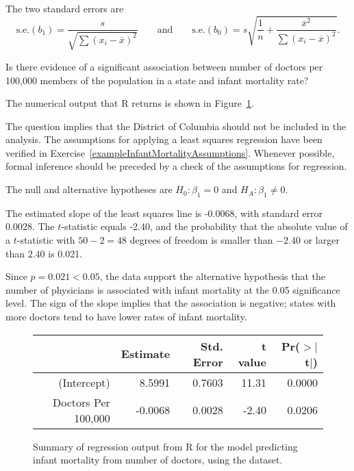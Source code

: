 The two standard errors are
\[\text{s.e.}(b_1) = \frac{s}{\sqrt{\sum(x_i -\overline{x})^2}}  \qquad \text{and} \qquad \text{s.e.}(b_0) = s \sqrt{\frac{1}{n} + \frac{\overline{x}^2}
	{\sum(x_i - \overline{x})^2}}. \]

\textD{\newpage}

\begin{examplewrap}
\begin{nexample}{Is there evidence of a significant association between number of doctors per 100,000 members of the population in a state and infant mortality rate? 
		
The numerical output that \textsf{R} returns is shown in Figure~\ref{infantMortalityInferenceOutput}.\footnotemark{}}\label{exampleInfantMortalityInference}%
The question implies that the District of Columbia should not be included in the analysis. The assumptions for applying a least squares regression have been verified in Exercise~\ref{exampleInfantMortalityAssumptions}. Whenever possible, formal inference should be preceded by a check of the assumptions for regression.

The null and alternative hypotheses are $H_0:\beta_1 = 0$ and $H_A:\beta_1 \neq 0.$	

The estimated slope of the least squares line is -0.0068, with standard error 0.0028. The $t$-statistic equals -2.40, and the probability that the absolute value of a $t$-statistic with $50-2=48$ degrees of freedom is smaller than $-2.40$ or larger than $2.40$ is 0.021. 

Since $p = 0.021 < 0.05$, the data support the alternative hypothesis that the number of physicians is associated with infant mortality at the 0.05 significance level. The sign of the slope implies that the association is negative; states with more doctors tend to have lower rates of infant mortality.
\end{nexample}
\end{examplewrap}

\begin{figure}[h]
	\centering
	\begin{tabular}{rrrrr}
		\hline
		& Estimate & Std. Error & t value & Pr($>$$|$t$|$) \\ 
		\hline
		(Intercept) & 8.5991 & 0.7603 & 11.31 & 0.0000 \\ 
		Doctors Per 100,000 & -0.0068 & 0.0028 & -2.40 & 0.0206 \\ 
		\hline
	\end{tabular}
	\caption{Summary of regression output from \textsf{R} for the model predicting infant mortality from number of doctors, using the  dataset.}
	\label{infantMortalityInferenceOutput}
\end{figure}

